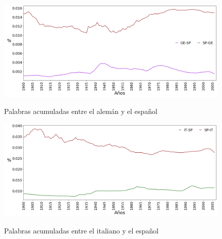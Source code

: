 \begin{figure}[h!]
	\centering
	\includegraphics[scale=.38]{Cap_4/SF_4_S2_GE.png}
	\label{fig.SF_GS}
	\caption{Palabras acumuladas entre el alemán y el español}
\end{figure}


\begin{figure}[h!]
	\centering
	\includegraphics[scale=.38]{Cap_4/SF_4_S2_IT.png}
	\label{fig.SF_IE}
	\caption{Palabras acumuladas entre el italiano y el español}
\end{figure}
